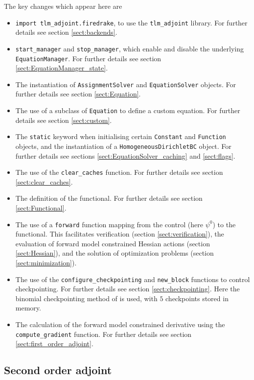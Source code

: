 \documentclass[11pt]{article}
\begin{document}
The key changes which appear here are
\begin{itemize}
  \item \texttt{import tlm\_adjoint.firedrake}, to use the
    \texttt{tlm\_adjoint} library. For further details see section
    \ref{sect:backends}.
  \item \texttt{start\_manager} and \texttt{stop\_manager}, which enable and
    disable the underlying \texttt{EquationManager}. For further details see
    section \ref{sect:EquationManager_state}.
  \item The instantiation of \texttt{AssignmentSolver} and
    \texttt{EquationSolver} objects. For further details see section
    \ref{sect:Equation}.
  \item The use of a subclass of \texttt{Equation} to define a custom equation.
    For further details see section \ref{sect:custom}.
  \item The \texttt{static} keyword when initialising certain \texttt{Constant}
    and \texttt{Function} objects, and the instantiation of a
    \texttt{HomogeneousDirichletBC} object. For further details see sections
    \ref{sect:EquationSolver_caching} and \ref{sect:flags}.
  \item The use of the \texttt{clear\_caches} function. For further details see
    section \ref{sect:clear_caches}.
  \item The definition of the functional. For further details see section
    \ref{sect:Functional}.
  \item The use of a \texttt{forward} function mapping from the control (here
    $\psi^0$) to the functional. This facilitates verification (section
    \ref{sect:verification}), the evaluation of forward model constrained
    Hessian actions (section \ref{sect:Hessian}), and the solution of
    optimization problems (section \ref{sect:minimization}).
  \item The use of the \texttt{configure\_checkpointing} and
    \texttt{new\_block} functions to control checkpointing. For further details
    see section \ref{sect:checkpointing}. Here the binomial checkpointing
    method of \citet{griewank2000} is used, with $5$ checkpoints stored in
    memory. 
  \item The calculation of the forward model constrained derivative using the
    \texttt{compute\_gradient} function. For further details see section
    \ref{sect:first_order_adjoint}.
\end{itemize}

\subsection{Second order adjoint}
\end{document}
